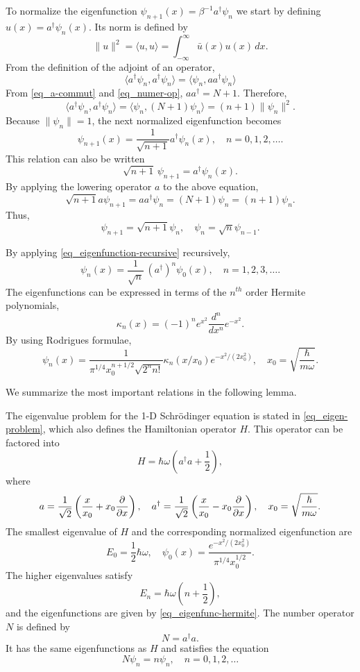 \documentclass[11pt]{article}
\begin{document}
To normalize the eigenfunction $\psi_{n+1}(x) = \beta^{-1} a^\dag \psi_n$ we start by defining $u(x) =
a^\dag\psi_n(x)$. Its norm is defined by
\[
\| u \|^2 = \langle u, u \rangle = \int_{-\infty}^\infty \bar{u}(x) u(x)\, dx.
\]
From the definition of the adjoint of an operator,
\[
\langle a^\dag\psi_n, a^\dag\psi_n\rangle = \langle \psi_n, a a^\dag \psi_n \rangle
\]
From \eqref{eq_a-commut} and \eqref{eq_numer-op}, $a a^\dag = N + 1$. Therefore,
\[
\langle a^\dag\psi_n, a^\dag\psi_n\rangle = \langle \psi_n, (N+1)\psi_n \rangle = (n+1) \| \psi_n \|^2.
\]
Because $\| \psi_n \|=1$, the next normalized eigenfunction becomes
\begin{equation}\label{eq_eigenfunction-recursive}
\psi_{n+1}(x) = \frac{1}{\sqrt{n+1}} a^\dag\psi_n(x),\quad n=0,1,2,\ldots.
\end{equation}
This relation can also be written
\[
\sqrt{n+1}\, \psi_{n+1} = a^\dag \psi_n(x).
\]
By applying the lowering operator $a$ to the above equation,
\[
\sqrt{n+1} a\psi_{n+1} = a a^\dag \psi_n = (N+1) \psi_n = (n+1) \psi_n.
\]
Thus,
\[
\psi_{n+1} = \sqrt{n+1} \psi_n,\quad \psi_n = \sqrt{n} \psi_{n-1}.
\]

By applying \eqref{eq_eigenfunction-recursive} recursively,
\[
\psi_{n}(x) = \frac{1}{\sqrt{n}}\,
(a^\dag)^n\psi_0(x),\quad n=1,2,3,\ldots. 
\]
The eigenfunctions can be expressed in terms of the $n^{th}$ order Hermite polynomials,
\[
\kappa_n(x) = (-1)^n e^{x^2} \frac{d^n}{dx^n} e^{-x^2}.
\]
By using Rodrigues formulae,
\begin{equation}\label{eq_eigenfunc-hermite}
\psi_n(x) = \frac{1}{\pi^{1/4} x_0^{n+1/2} \sqrt{2^n n!}} \kappa_n(x/x_0) e^{-x^2/(2 x_0^2)},\quad
x_0=\sqrt{\frac{\hbar}{m\omega}}.
\end{equation}


We summarize the most important relations in the following lemma.
\begin{lemma}
The eigenvalue problem for the 1-D Schr\"odinger equation is stated in \eqref{eq_eigen-problem},
which also defines the Hamiltonian operator $H$. This operator can be factored into
\[
H = \hbar\omega \left( a^\dag a + \frac{1}{2} \right),
\]
where
\[
a = \frac{1}{\sqrt{2}}\left( \frac{x}{x_0} + x_0 \frac{\p}{\p x}\right),\quad
%
a^\dag = \frac{1}{\sqrt{2}}\left( \frac{x}{x_0} - x_0 \frac{\p}{\p x}\right),\quad
x_0=\sqrt{\frac{\hbar}{m\omega}}.
\]
The smallest eigenvalue of $H$ and the corresponding normalized eigenfunction are
\[
E_0 = \frac{1}{2}\hbar\omega,\quad \psi_0(x) = \frac{e^{-x^2/(2 x_0^2)}}{\pi^{1/4} x_0^{1/2}}.
\]
The higher eigenvalues satisfy
\[
E_n = \hbar\omega\left(n + \frac{1}{2}\right),
\]
and the eigenfunctions are given by \eqref{eq_eigenfunc-hermite}. The number operator $N$ is defined
by
\[
N = a^\dag a.
\]
It has the same eigenfunctions as $H$ and satisfies the equation
\[
N\psi_n = n \psi_n,\quad n=0,1,2,\ldots
\]
\end{lemma}





\end{document}
